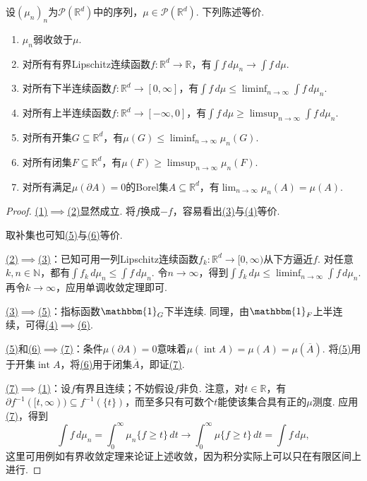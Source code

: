 \begin{theorem}[Portmanteau定理]\label{thm:B.4}
设$(\mu_n)_n$为$\mathcal P(\mathbb R^d)$中的序列，$\mu\in\mathcal P(\mathbb R^d)$. 下列陈述等价.
\begin{enumerate}
\item\label{item:B.4.1} $\mu_n$弱收敛于$\mu$.
\item\label{item:B.4.2} 对所有有界Lipschitz连续函数$f:\mathbb R^d\to\mathbb R$，有$\int f\,d\mu_n\to\int f\,d\mu$.
\item\label{item:B.4.3} 对所有下半连续函数$f:\mathbb R^d\to[0,\infty]$，有$\int f\,d\mu\leq\liminf_{n\to\infty}\int f\,d\mu_n$.
\item\label{item:B.4.4} 对所有上半连续函数$f:\mathbb R^d\to[-\infty,0]$，有$\int f\,d\mu\geq\limsup_{n\to\infty}\int f\,d\mu_n$.
\item\label{item:B.4.5} 对所有开集$G\subseteq\mathbb R^d$，有$\mu(G)\leq\liminf_{n\to\infty}\mu_n(G)$.
\item\label{item:B.4.6} 对所有闭集$F\subseteq\mathbb R^d$，有$\mu(F)\geq\limsup_{n\to\infty}\mu_n(F)$.
\item\label{item:B.4.7} 对所有满足$\mu(\partial A)=0$的Borel集$A\subseteq\mathbb R^d$，有$\lim_{n\to\infty}\mu_n(A)=\mu(A)$.
\end{enumerate}
\end{theorem}

\begin{proof}
\hyperref[item:B.4.1]{(1)}$\implies$\hyperref[item:B.4.2]{(2)}显然成立. 将$f$换成$-f$，容易看出\hyperref[item:B.4.3]{(3)}与\hyperref[item:B.4.4]{(4)}等价.

取补集也可知\hyperref[item:B.4.5]{(5)}与\hyperref[item:B.4.6]{(6)}等价.

\hyperref[item:B.4.2]{(2)}$\implies$\hyperref[item:B.4.3]{(3)}：已知可用一列Lipschitz连续函数$f_k:\mathbb R^d\to[0,\infty)$从下方逼近$f$. 对任意$k,n\in\mathbb N$，都有$\int f_k\,d\mu_n\leq\int f\,d\mu_n$. 令$n\to\infty$，得到$\int f_k\,d\mu\leq\liminf_{n\to\infty}\int f\,d\mu_n$. 再令$k\to\infty$，应用单调收敛定理即可.

\hyperref[item:B.4.3]{(3)}$\implies$\hyperref[item:B.4.5]{(5)}：指标函数$\mathbbm{1}_G$下半连续. 同理，由$\mathbbm{1}_F$上半连续，可得\hyperref[item:B.4.4]{(4)}$\implies$\hyperref[item:B.4.6]{(6)}.

\hyperref[item:B.4.5]{(5)}和\hyperref[item:B.4.6]{(6)}$\implies$\hyperref[item:B.4.7]{(7)}：条件$\mu(\partial A)=0$意味着$\mu(\operatorname{int}A)=\mu(A)=\mu(\overline A)$. 将\hyperref[item:B.4.5]{(5)}用于开集$\operatorname{int}A$，将\hyperref[item:B.4.6]{(6)}用于闭集$\overline A$，即证\hyperref[item:B.4.7]{(7)}.

\hyperref[item:B.4.7]{(7)}$\implies$\hyperref[item:B.4.1]{(1)}：设$f$有界且连续；不妨假设$f$非负. 注意，对$t\in\mathbb R$，有$\partial f^{-1}([t,\infty))\subseteq f^{-1}(\{t\})$，而至多只有可数个$t$能使该集合具有正的$\mu$测度. 应用\hyperref[item:B.4.7]{(7)}，得到
$$
\int f\,d\mu_n=\int_0^\infty\mu_n\{f\geq t\}\,dt
\longrightarrow\int_0^\infty\mu\{f\geq t\}\,dt=\int f\,d\mu,
$$
这里可用例如有界收敛定理来论证上述收敛，因为积分实际上可以只在有限区间上进行.
\end{proof}

